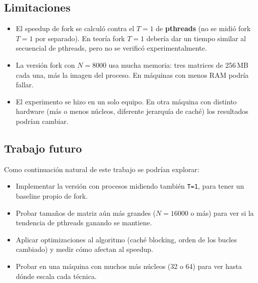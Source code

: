 \subsection{Limitaciones}

\begin{itemize}
    \item El speedup de fork se calculó contra el $T = 1$ de \textbf{pthreads} (no se midió fork $T = 1$ por separado). En teoría fork $T = 1$ debería dar un tiempo similar al secuencial de pthreads, pero no se verificó experimentalmente.
    \item La versión fork con $N = 8000$ usa mucha memoria: tres matrices de 256\,MB cada una, más la imagen del proceso. En máquinas con menos RAM podría fallar.
    \item El experimento se hizo en un solo equipo. En otra máquina con distinto hardware (más o menos núcleos, diferente jerarquía de caché) los resultados podrían cambiar.
\end{itemize}

\subsection{Trabajo futuro}

Como continuación natural de este trabajo se podrían explorar:

\begin{itemize}
    \item Implementar la versión con procesos midiendo también \texttt{T=1}, para tener un baseline propio de fork.
    \item Probar tamaños de matriz aún más grandes ($N = 16000$ o más) para ver si la tendencia de pthreads ganando se mantiene.
    \item Aplicar optimizaciones al algoritmo (caché blocking, orden de los bucles cambiado) y medir cómo afectan al speedup.
    \item Probar en una máquina con muchos más núcleos (32 o 64) para ver hasta dónde escala cada técnica.
\end{itemize}
